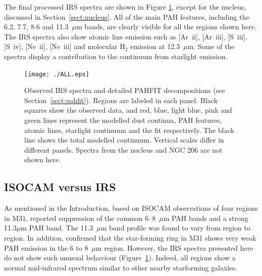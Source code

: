 
The final processed IRS spectra are shown in  Figure \ref{PAHFITplots}, except for the nucleus, discussed in Section~\ref{sect:nucleus}.
All of the main PAH features, including the 6.2, 7.7, 8.6 and 11.3~$\mu$m bands, 
are clearly visible for all the regions shown here.
The IRS spectra also show atomic line emission such as [Ar~{\sc ii}], [Ar~{\sc iii}], [S~{\sc iii}], [S~{\sc iv}], [Ne~{\sc ii}], [Ne~{\sc iii}] 
and molecular H$_{2}$ emission at 12.3~$\mu$m. Some of the spectra display a contribution to the continuum from starlight emission.

\begin{figure}
\centering
\texttt{[image: ./ALL.eps]}
 \caption{Observed IRS spectra and detailed PAHFIT decompositions (see Section~\ref{sect:pahfit}). Regions are labeled in each panel.
Black squares show the observed data, and red, blue, light blue, pink and green lines represent the modelled
dust continua, PAH features, atomic lines, starlight continuum and the fit respectively. The black line shows the total modelled continuum. 
Vertical scales differ in different panels. Spectra from the nucleus and NGC 206 are not shown here.
}
\label{PAHFITplots}
\end{figure}


\subsection{ISOCAM versus IRS}
\label{sect:iso_vs_irs}

As mentioned in the Introduction, based on ISOCAM observations of four regions in M31, \citet{1998Cesarsky} reported 
suppression of the common 6--8~$\mu$m PAH bands and a strong 11.3$\mu$m PAH band.
The 11.3~$\mu$m band profile was found to vary from region to region.  
In addition, \citet{Pagani_1999} confirmed that the star-forming ring in M31 shows very weak PAH emission in the 6 to 8~$\mu$m region. 
However, the IRS spectra presented here do not show such unusual behaviour (Figure~\ref{PAHFITplots}). 
Indeed, all regions show a normal mid-infrared spectrum similar to other nearby starforming galaxies. 

